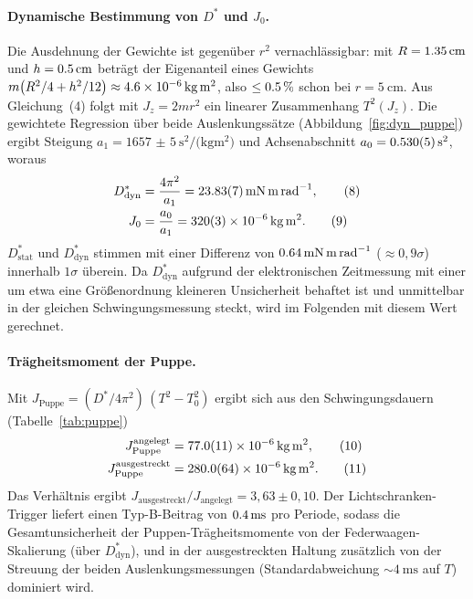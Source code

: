 \documentclass[11pt,a4paper]{article}
\begin{document}
\paragraph{Dynamische Bestimmung von $D^{*}$ und $J_{0}$.}
Die Ausdehnung der Gewichte ist gegenüber $r^{2}$ vernachlässigbar:
mit $R=\SI{1{,}35}{\centi\metre}$ und $h=\SI{0{,}5}{\centi\metre}$
beträgt der Eigenanteil eines Gewichts
$m\bigl(R^{2}/4 + h^{2}/12\bigr) \approx \SI{4{,}6e-6}{\kilogram\metre\squared}$, also
$\le\SI{0{,}5}{\percent}$ schon bei $r=\SI{5}{\centi\metre}$. Aus
Gleichung~(4) folgt mit $J_{z}=2mr^{2}$ ein linearer Zusammenhang
$T^{2}(J_{z})$. Die gewichtete Regression über beide
Auslenkungssätze (Abbildung~\ref{fig:dyn_puppe}) ergibt Steigung
$a_{1}=\SI{1657(5)}{\second\squared\per(\kilogram\metre\squared)}$ und
Achsenabschnitt $a_{0}=\SI{0{,}530(5)}{\second\squared}$, woraus
\begin{align}
  D^{*}_{\mathrm{dyn}} &= \frac{4\pi^{2}}{a_{1}} = \SI{23{,}83(7)}{\milli\newton\metre\per\radian}, \tag{8}\\
  J_{0}                &= \frac{a_{0}}{a_{1}} = \SI{320(3)e-6}{\kilogram\metre\squared}. \tag{9}
\end{align}
$D^{*}_{\mathrm{stat}}$ und $D^{*}_{\mathrm{dyn}}$ stimmen mit einer
Differenz von $\SI{0{,}64}{\milli\newton\metre\per\radian}$
($\approx 0{,}9\sigma$) innerhalb $1\sigma$ überein. Da
$D^{*}_{\mathrm{dyn}}$ aufgrund der elektronischen Zeitmessung mit
einer um etwa eine Größenordnung kleineren Unsicherheit behaftet ist
und unmittelbar in der gleichen Schwingungsmessung steckt, wird im
Folgenden mit diesem Wert gerechnet.

\paragraph{Trägheitsmoment der Puppe.}
Mit $J_{\mathrm{Puppe}} = (D^{*}/4\pi^{2})\,(T^{2}-T_{0}^{2})$ ergibt
sich aus den Schwingungsdauern (Tabelle~\ref{tab:puppe})
\begin{align}
  J_{\mathrm{Puppe}}^{\text{angelegt}}    &= \SI{77{,}0(11)e-6}{\kilogram\metre\squared}, \tag{10}\\
  J_{\mathrm{Puppe}}^{\text{ausgestreckt}} &= \SI{280{,}0(64)e-6}{\kilogram\metre\squared}. \tag{11}
\end{align}
Das Verhältnis ergibt
$J_{\text{ausgestreckt}}/J_{\text{angelegt}} = 3{,}63 \pm 0{,}10$.
Der Lichtschranken-Trigger liefert einen Typ-B-Beitrag von
$\SI{0{,}4}{\milli\second}$ pro Periode, sodass die
Gesamtunsicherheit der Puppen-Trägheitsmomente von der
Federwaagen-Skalierung (über $D^{*}_{\mathrm{dyn}}$), und in der
ausgestreckten Haltung zusätzlich von der Streuung der beiden
Auslenkungsmessungen
(Standardabweichung $\sim\SI{4}{\milli\second}$ auf $T$) dominiert
wird.
\end{document}
